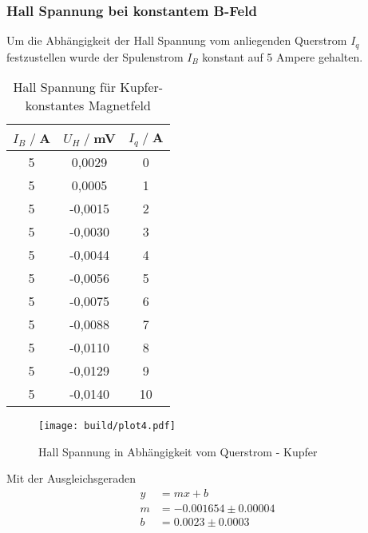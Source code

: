 \subsubsection{Hall Spannung bei konstantem B-Feld}
Um die Abhängigkeit der Hall Spannung vom anliegenden Querstrom $I_q$ festzustellen wurde der Spulenstrom $I_B$ konstant auf 5 Ampere gehalten.
\begin{table}[H]
    \centering
    \begin{tabular}{c c c}
        \toprule
        $I_B \;/\;$A & $U_H\;/\;$mV & $I_q \;/\;$A\\
        \midrule
            5                   & 0,0029&             0\\
            5                   & 0,0005&             1\\
            5                   &-0,0015&             2\\
            5                   &-0,0030&             3\\
            5                   &-0,0044&             4\\
            5                   &-0,0056&             5\\
            5                   &-0,0075&             6\\
            5                   &-0,0088&             7\\
            5                   &-0,0110&             8\\
            5                   &-0,0129&             9\\
            5                   &-0,0140&             10\\
        \bottomrule
    \end{tabular}
    \caption{Hall Spannung für Kupfer- konstantes Magnetfeld}
    \label{tab:Ag_I}
\end{table}
\begin{figure}[H]
    \centering
    \texttt{[image: build/plot4.pdf]}
    \caption{Hall Spannung in Abhängigkeit vom Querstrom - Kupfer}
    \label{fig:Ag_I}
\end{figure}
Mit der Ausgleichsgeraden
\begin{align*}
    y &= mx + b\\
    m &= -0.001654\pm 0.00004\\  
    b &=  0.0023\pm 0.0003\\
\end{align*}

